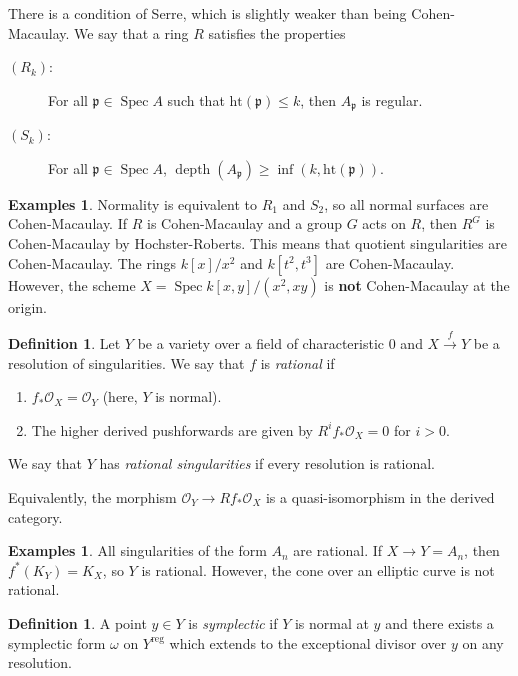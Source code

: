 \documentclass[leqno, openany]{memoir}
\theoremstyle{definition}
\newtheorem{defn}[thm]{Definition}
\newtheorem{exms}[thm]{Examples}
\theoremstyle{remark}
\theoremstyle{plain}
\theoremstyle{definition}
\theoremstyle{remark}
\newcommand{\msc}[1]{\mathscr{#1}}
\newcommand{\mf}[1]{\mathfrak{#1}}
\newcommand{\mr}[1]{\mathrm{#1}}
\DeclareMathOperator{\Spec}{Spec}
\begin{document}
There is a condition of Serre, which is slightly weaker than being Cohen-Macaulay. We say that a ring $R$ satisfies the properties
\begin{description}
    \item[$(R_k)$:] For all $\mf{p} \in \Spec A$ such that $\mr{ht}(\mf{p}) \leq k$, then $A_{\mf{p}}$ is regular.
    \item[$(S_k)$:] For all $\mf{p} \in \Spec A$, $\operatorname{depth}(A_{\mf{p}}) \geq \inf (k, \mr{ht}(\mf{p}))$.
\end{description}

\begin{exms}
    Normality is equivalent to $R_1$ and $S_2$, so all normal surfaces are Cohen-Macaulay. If $R$ is Cohen-Macaulay and a group $G$ acts on $R$, then $R^G$ is Cohen-Macaulay by Hochster-Roberts. This means that quotient singularities are Cohen-Macaulay. The rings $k[x]/x^2$ and $k[t^2, t^3]$ are Cohen-Macaulay. However, the scheme $X = \Spec k[x,y]/(x^2, xy)$ is \textbf{not} Cohen-Macaulay at the origin.
\end{exms}

\begin{defn}
    Let $Y$ be a variety over a field of characteristic $0$ and $X \xrightarrow{f} Y$ be a resolution of singularities. We say that $f$ is \textit{rational} if 
    \begin{enumerate}
        \item $f_* \msc{O}_X = \msc{O}_Y$ (here, $Y$ is normal).
        \item The higher derived pushforwards are given by $R^i f_* \msc{O}_X = 0$ for $i > 0$.
    \end{enumerate}
    We say that $Y$ has \textit{rational singularities} if every resolution is rational.
\end{defn}

Equivalently, the morphism $\msc{O}_Y \to R f_* \msc{O}_X$ is a quasi-isomorphism in the derived category.

\begin{exms}
    All singularities of the form $A_n$ are rational. If $X \to Y = A_n$, then $f^*(K_Y) = K_X$, so $Y$ is rational. However, the cone over an elliptic curve is not rational.
\end{exms}

\begin{defn}
    A point $y \in Y$ is \textit{symplectic} if $Y$ is normal at $y$ and there exists a symplectic form $\omega$ on $Y^{\mr{reg}}$ which extends to the exceptional divisor over $y$ on any resolution.
\end{defn}
\end{document}
